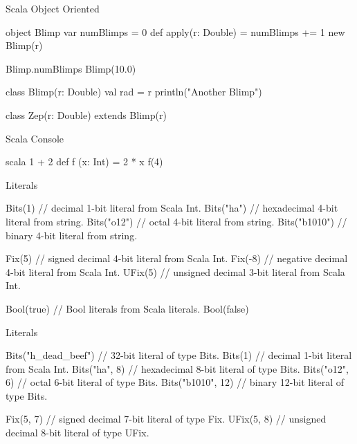 \documentclass[xcolor=pdflatex,dvipsnames,table]{beamer}
\newenvironment{FramedVerb}%
{\VerbatimEnvironment
\begin{Sbox}\begin{minipage}{.94\textwidth}\begin{Verbatim}}%
{\end{Verbatim}\end{minipage}\end{Sbox}
\setlength{\fboxsep}{8pt}\fbox{\TheSbox}}
\begin{document}
\begin{frame}[fragile]{Scala Object Oriented}

\begin{scala}
object Blimp {
  var numBlimps = 0
  def apply(r: Double) = {
    numBlimps += 1
    new Blimp(r)
  }
}

Blimp.numBlimps
Blimp(10.0)

class Blimp(r: Double) {
  val rad = r
  println("Another Blimp")
}

class Zep(r: Double) extends Blimp(r)
\end{scala}

\end{frame}

\begin{frame}[fragile]{Scala Console}
\begin{scala}
scala
1 + 2
def f (x: Int) = 2 * x
f(4)
\end{scala}
\end{frame}


\begin{frame}[fragile]{Literals}
\begin{scala}
Bits(1)       // decimal 1-bit literal from Scala Int. 
Bits("ha")    // hexadecimal 4-bit literal from string.
Bits("o12")   // octal 4-bit literal from string. 
Bits("b1010") // binary 4-bit literal from string.

Fix(5)        // signed decimal 4-bit literal from Scala Int.
Fix(-8)       // negative decimal 4-bit literal from Scala Int.
UFix(5)       // unsigned decimal 3-bit literal from Scala Int.

Bool(true)    // Bool literals from Scala literals.
Bool(false)
\end{scala}
\end{frame}
 
\begin{frame}[fragile]{Literals}
\begin{scala}
Bits("h_dead_beef") // 32-bit literal of type Bits.
Bits(1)             // decimal 1-bit literal from Scala Int.
Bits("ha", 8)       // hexadecimal 8-bit literal of type Bits.
Bits("o12", 6)      // octal 6-bit literal of type Bits.
Bits("b1010", 12)   // binary 12-bit literal of type Bits.

Fix(5, 7)           // signed decimal 7-bit literal of type Fix.
UFix(5, 8)          // unsigned decimal 8-bit literal of type UFix.
\end{scala}
\end{frame}
\end{document}
